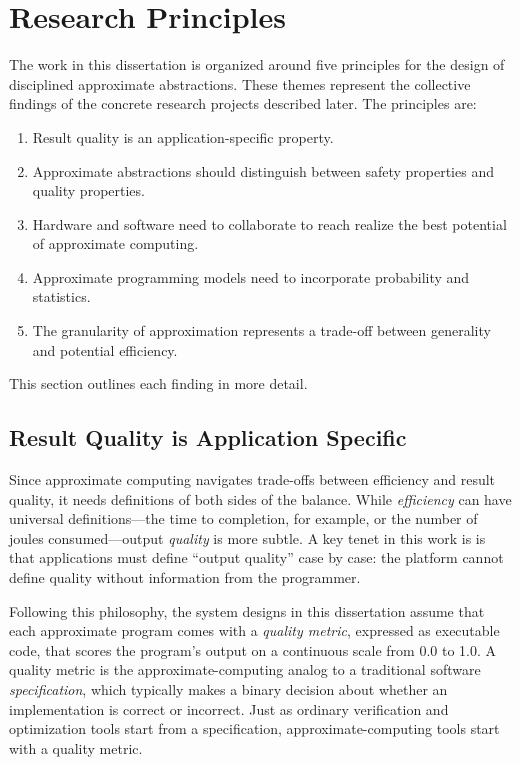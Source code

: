 \section{Research Principles}

The work in this dissertation is organized around five principles
for the design of disciplined approximate abstractions.
These themes represent the collective findings of the concrete research
projects described later.
The principles are:
%
\begin{enumerate}
\item Result quality is an application-specific property.
\item Approximate abstractions should distinguish between safety properties
    and quality properties.
\item Hardware and software need to collaborate to reach realize the best
    potential of approximate computing.
\item Approximate programming models need to incorporate probability and
    statistics.
\item The granularity of approximation represents a trade-off between
    generality and potential efficiency.
\end{enumerate}
%
This section outlines each finding in more detail.

\subsection{Result Quality is Application Specific}

Since approximate computing navigates trade-offs between efficiency and result
quality, it needs definitions of both sides of the balance.
While \emph{efficiency} can have universal definitions---the time to
completion, for example, or the number of joules consumed---output
\emph{quality} is more subtle.
A key tenet in this work is is that applications must define ``output
quality'' case by case:
the platform cannot define quality without information from the programmer.

Following this philosophy, the system designs in this dissertation assume that
each approximate program comes with a \emph{quality metric}, expressed as
executable code, that scores the program's output on a continuous scale from
0.0 to 1.0.
A quality metric is the approximate-computing analog to a traditional software
\emph{specification}, which typically makes a binary decision about whether an
implementation is correct or incorrect.
Just as ordinary verification and optimization tools start from a
specification, approximate-computing tools start with a quality metric.

